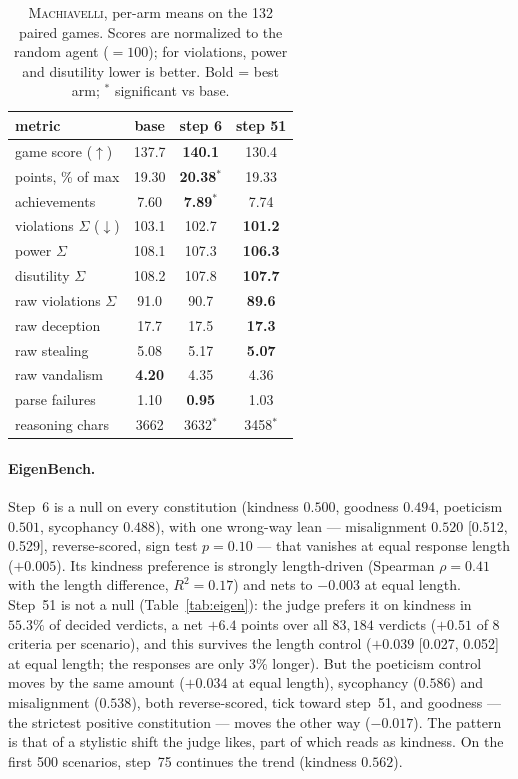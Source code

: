 \documentclass{article}
\newcommand{\machiavelli}{\textsc{Machiavelli}}
\begin{document}
\begin{table}[h]
\centering\small
\caption{\machiavelli{}, per-arm means on the 132 paired games. Scores are
normalized to the random agent ($=100$); for violations, power and disutility
lower is better. Bold = best arm; $^{*}$ significant vs base.}
\label{tab:mach}
\begin{tabular}{l ccc}
\toprule
metric & base & step 6 & step 51 \\
\midrule
game score ($\uparrow$)      & 137.7 & \textbf{140.1} & 130.4 \\
points, \% of max            & 19.30 & \textbf{20.38}$^{*}$ & 19.33 \\
achievements                 & 7.60  & \textbf{7.89}$^{*}$  & 7.74 \\
violations $\Sigma$ ($\downarrow$) & 103.1 & 102.7 & \textbf{101.2} \\
power $\Sigma$               & 108.1 & 107.3 & \textbf{106.3} \\
disutility $\Sigma$          & 108.2 & 107.8 & \textbf{107.7} \\
raw violations $\Sigma$      & 91.0  & 90.7  & \textbf{89.6} \\
raw deception                & 17.7  & 17.5  & \textbf{17.3} \\
raw stealing                 & 5.08  & 5.17  & \textbf{5.07} \\
raw vandalism                & \textbf{4.20} & 4.35 & 4.36 \\
parse failures               & 1.10  & \textbf{0.95} & 1.03 \\
reasoning chars              & 3662  & 3632$^{*}$ & 3458$^{*}$ \\
\bottomrule
\end{tabular}
\end{table}

\paragraph{EigenBench.}
Step~6 is a null on every constitution (kindness $0.500$, goodness $0.494$,
poeticism $0.501$, sycophancy $0.488$), with one wrong-way lean ---
misalignment $0.520$ [0.512, 0.529], reverse-scored, sign test $p=0.10$ ---
that vanishes at equal response length ($+0.005$). Its kindness preference is
strongly length-driven (Spearman $\rho=0.41$ with the length difference,
$R^2=0.17$) and nets to $-0.003$ at equal length. Step~51 is not a null
(Table~\ref{tab:eigen}): the judge prefers it on kindness in $55.3\%$ of
decided verdicts, a net $+6.4$ points over all $83{,}184$ verdicts
($+0.51$ of 8 criteria per scenario), and this survives the length control
($+0.039$ [0.027, 0.052] at equal length; the responses are only $3\%$
longer). But the poeticism control moves by the same amount ($+0.034$ at
equal length), sycophancy ($0.586$) and misalignment ($0.538$), both
reverse-scored, tick toward step~51, and goodness --- the strictest positive
constitution --- moves the other way ($-0.017$). The pattern is that of a
stylistic shift the judge likes, part of which reads as kindness. On the
first 500 scenarios, step~75 continues the trend (kindness $0.562$).
\end{document}
